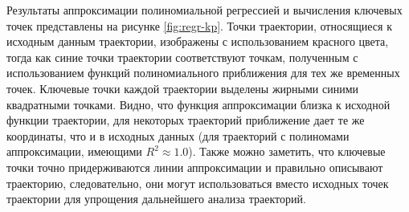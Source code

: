 Результаты аппроксимации полиномиальной регрессией и вычисления ключевых точек представлены на рисунке \ref{fig:regr-kp}. Точки траектории, относящиеся к исходным данным траектории, изображены с использованием красного цвета, тогда как синие точки траектории соответствуют точкам, полученным с использованием функций полиномиального приближения для тех же временных точек. Ключевые точки каждой траектории выделены жирными синими квадратными точками. Видно, что функция аппроксимации близка к исходной функции траектории, для некоторых траекторий приближение дает те же координаты, что и в исходных данных (для траекторий с полиномами аппроксимации, имеющими $R^2 \approx 1.0$). Также можно заметить, что ключевые точки точно придерживаются линии аппроксимации и правильно описывают траекторию, следовательно, они могут использоваться вместо исходных точек траектории для упрощения дальнейшего анализа траекторий.


